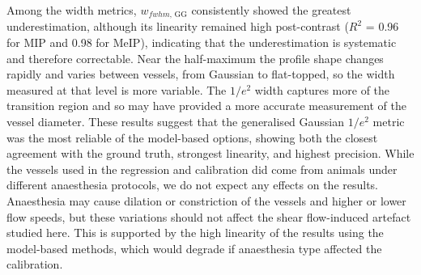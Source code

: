 \documentclass{optica-article}
\begin{document}
Among the width metrics, $w_{fwhm,\,\mathrm{GG}}$ consistently showed the greatest underestimation, although its linearity remained high post-contrast ($R^2$ = 0.96 for MIP and 0.98 for MeIP), indicating that the underestimation is systematic and therefore correctable. Near the half-maximum the profile shape changes rapidly and varies between vessels, from Gaussian to flat-topped, so the width measured at that level is more variable. The $1/e^2$ width captures more of the transition region and so may have provided a more accurate measurement of the vessel diameter. These results suggest that the generalised Gaussian $1/e^2$ metric was the most reliable of the model-based options, showing both the closest agreement with the ground truth, strongest linearity, and highest precision. While the vessels used in the regression and calibration did come from animals under different anaesthesia protocols, we do not expect any effects on the results. Anaesthesia may cause dilation or constriction of the vessels and higher or lower flow speeds, but these variations should not affect the shear flow-induced artefact studied here. This is supported by the high linearity of the results using the model-based methods, which would degrade if anaesthesia type affected the calibration.
\end{document}
